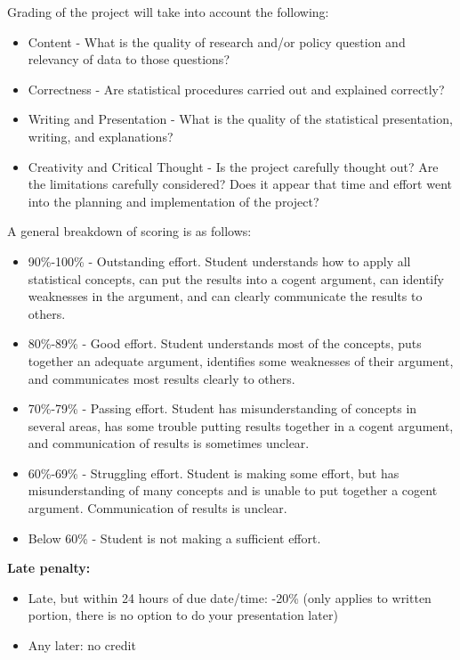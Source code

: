 \documentclass[
]{book}
\providecommand{\tightlist}{%
  \setlength{\itemsep}{0pt}\setlength{\parskip}{0pt}}
\begin{document}
Grading of the project will take into account the following:

\begin{itemize}
\tightlist
\item
  Content - What is the quality of research and/or policy question and relevancy
  of data to those questions?
\item
  Correctness - Are statistical procedures carried out and explained correctly?
\item
  Writing and Presentation - What is the quality of the statistical presentation,
  writing, and explanations?
\item
  Creativity and Critical Thought - Is the project carefully thought out? Are the
  limitations carefully considered? Does it appear that time and effort went into
  the planning and implementation of the project?
\end{itemize}

A general breakdown of scoring is as follows:

\begin{itemize}
\tightlist
\item
  90\%-100\% - Outstanding effort. Student understands how to apply all statistical
  concepts, can put the results into a cogent argument, can identify weaknesses in
  the argument, and can clearly communicate the results to others.
\item
  80\%-89\% - Good effort. Student understands most of the concepts, puts together
  an adequate argument, identifies some weaknesses of their argument, and communicates
  most results clearly to others.
\item
  70\%-79\% - Passing effort. Student has misunderstanding of concepts in several
  areas, has some trouble putting results together in a cogent argument, and communication
  of results is sometimes unclear.
\item
  60\%-69\% - Struggling effort. Student is making some effort, but has misunderstanding
  of many concepts and is unable to put together a cogent argument. Communication
  of results is unclear.
\item
  Below 60\% - Student is not making a sufficient effort.
\end{itemize}

\textbf{Late penalty:}

\begin{itemize}
\tightlist
\item
  Late, but within 24 hours of due date/time: -20\% (only applies to written portion, there is no option to do your presentation later)
\item
  Any later: no credit
\end{itemize}

  
\end{document}
